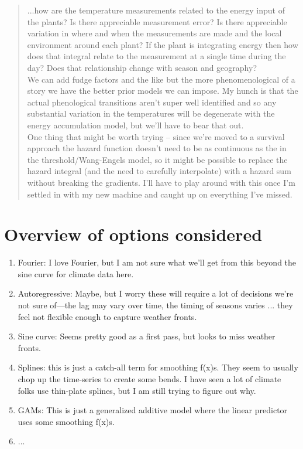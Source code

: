 \documentclass[11pt,letter]{article}
\begin{document}
\begin{quote}
...how are the temperature measurements related to the energy input of the plants?  Is there appreciable measurement error?  Is there appreciable variation in where and when the measurements are made and the local environment around each plant?  If the plant is integrating energy then how does that integral relate to the measurement at a single time during the day?  Does that relationship change with season and geography?\\

We can add fudge factors and the like but the more phenomenological of a story we have the better prior models we can impose.  My hunch is that the actual phenological transitions aren't super well identified and so any substantial variation in the temperatures will be degenerate with the energy accumulation model, but we'll have to bear that out.\\

One thing that might be worth trying -- since we're moved to a survival approach the hazard function doesn't need to be as continuous as the in the threshold/Wang-Engels model, so it might be possible to replace the hazard integral (and the need to carefully interpolate) with a hazard sum without breaking the gradients.  I'll have to play around with this once I'm settled in with my new machine and caught up on everything I've missed.
\end{quote}


\section{Overview of options considered}

\begin{enumerate}
\item Fourier: I love Fourier, but I am not sure what we'll get from this beyond the sine curve for climate data here.  
\item Autoregressive: Maybe, but I worry these will require a lot of decisions we're not sure of---the lag may vary over time, the timing of seasons varies ... they feel not flexible enough to capture weather fronts. 
\item Sine curve: Seems pretty good as a first pass, but looks to miss weather fronts. 
\item Splines: this is just a catch-all term for smoothing f(x)s. They seem to usually chop up the time-series to create some bends. I have seen a lot of climate folks use thin-plate splines, but I am still trying to figure out why. 
\item GAMs: This is just a generalized additive model where the linear predictor uses some smoothing f(x)s. 
\item ... 
\end{enumerate}
\end{document}
